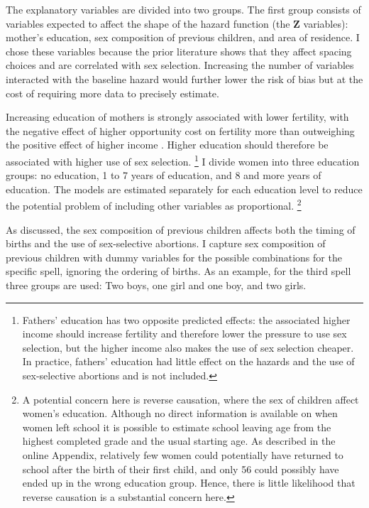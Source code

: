 \documentclass[12pt,letterpaper]{article}
\begin{document}
The explanatory variables are divided into two groups.
The first group consists of variables expected to affect the shape of the hazard function
(the $\mathbf{Z}$ variables): 
mother's education, sex composition of previous children, and area of residence.
I chose these variables because the prior literature shows that they affect 
spacing choices and are correlated with sex selection.
Increasing the number of variables interacted with the baseline hazard would
further lower the risk of bias but at the cost of requiring more data to 
precisely estimate.

Increasing education of mothers is strongly associated with lower fertility, with
the negative effect of higher opportunity cost on fertility more than outweighing the 
positive effect of higher income \citep{schultz97}.
Higher education should therefore be associated with higher use of sex selection.%
\footnote{
Fathers' education has two opposite predicted effects: the associated higher income
should increase fertility and therefore lower the pressure to use sex selection, but
the higher income also makes the use of sex selection cheaper.
In practice, fathers' education had little effect on the hazards and the use of 
sex-selective abortions and is not included.
}
I divide women into three education groups:
no education, 1 to 7 years of education, and 8 and more years of education.
The models are estimated separately for each education level to reduce
the potential problem of including other variables as proportional.%
\footnote{
A potential concern here is reverse causation, where the sex of children
affect women's education.
Although no direct information is available on when women left school it is
possible to estimate school leaving age from the highest completed grade
and the usual starting age.
As described in the online Appendix, relatively few women could potentially 
have returned to school after the birth of their first child,
and only 56 could possibly have ended up in the wrong education group. 
Hence, there is little likelihood that reverse causation is a substantial
concern here.
}

As discussed, the sex composition of previous children affects both the timing
of births and the use of sex-selective abortions.
I capture sex composition of previous children with dummy variables for the
possible combinations for the specific spell, ignoring the ordering of births.
As an example, for the third spell three groups are used: Two boys,
one girl and one boy, and two girls.
\end{document}
